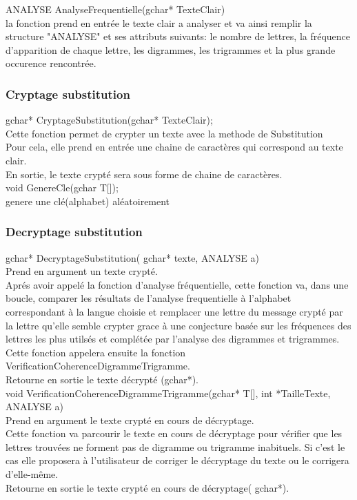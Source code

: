 \documentclass[a4]{article}
\begin{document}
		
		
	ANALYSE AnalyseFrequentielle(gchar* TexteClair)\\
		la fonction prend en entrée le texte clair a analyser et va ainsi remplir la structure "ANALYSE" et 
		ses attributs suivants:
		le nombre de lettres, la fréquence d'apparition de chaque lettre, les digrammes, les trigrammes
		et la plus grande occurence rencontrée.\\
		
	\subsubsection{Cryptage substitution}
	gchar* CryptageSubstitution(gchar* TexteClair);\\
		Cette fonction permet de crypter un texte avec la methode de Substitution\\
		Pour cela, elle prend en entrée une chaine de caractères qui correspond au texte clair.\\
		En sortie, le texte crypté sera sous forme de chaine de caractères.\\
		
	void GenereCle(gchar T[]);\\
		genere une clé(alphabet) aléatoirement
	
	\subsubsection{Decryptage substitution}
	gchar* DecryptageSubstitution( gchar* texte, ANALYSE a)\\
		Prend en argument un texte crypté.\\
		Aprés avoir appelé la fonction d'analyse fréquentielle, cette fonction va, 
		dans une boucle, comparer les résultats de l'analyse frequentielle à l'alphabet
		 correspondant à la langue choisie et remplacer une lettre du message crypté 
		 par la lettre qu'elle semble crypter grace à une conjecture basée sur les 
		 fréquences des lettres les plus utilsés et complétée par l'analyse des digrammes 
		 et trigrammes. Cette fonction appelera ensuite la fonction VerificationCoherenceDigrammeTrigramme.\\
		Retourne en sortie le texte décrypté (gchar*).\\


	void VerificationCoherenceDigrammeTrigramme(gchar* T[], int *TailleTexte, ANALYSE a)\\
		Prend en argument le texte crypté en cours de décryptage.\\
		Cette fonction va parcourir le texte en cours de décryptage pour vérifier que les lettres trouvées 
		ne forment pas de digramme ou trigramme inabituels. Si c'est le cas elle proposera à l'utilisateur 
		de corriger le décryptage du texte ou le corrigera d'elle-même.\\
		Retourne en sortie le texte crypté en cours de décryptage( gchar*).\\
	
\end{document}
